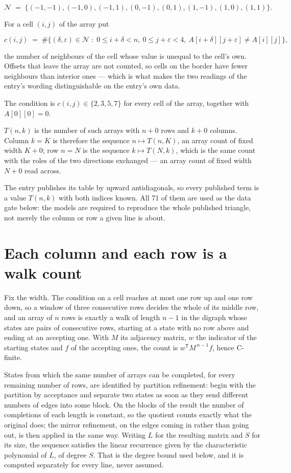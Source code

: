 \documentclass[11pt]{article}
\theoremstyle{definition}
\begin{document}
\[\mathcal{N} \;=\; \{(-1,-1), (-1,0), (-1,1), (0,-1), (0,1), (1,-1), (1,0), (1,1)\}.\]

For a cell $(i,j)$ of the array put

\[c(i,j) \;=\; \#\bigl\{(\delta,\varepsilon)\in\mathcal{N} \;:\; 0\le i+\delta<n,\ 0\le j+\varepsilon<4,\ A[i+\delta][j+\varepsilon] \neq A[i][j]\bigr\},\]

the number of neighbours of the cell whose value is unequal to the cell's own. Offsets that leave the array are not counted, so cells on the border have fewer neighbours than interior ones --- which is what makes the two readings of the entry's wording distinguishable on the entry's own data.

The condition is $c(i,j) \in \{2, 3, 5, 7\}$ for every cell of the array, together with $A[0][0]=0$.

$T(n,k)$ is the number of such arrays with $n + 0$ rows and $k + 0$ columns. Column $k = K$ is therefore the sequence $n \mapsto T(n,K)$, an array count of fixed width $K + 0$; row $n = N$ is the sequence $k \mapsto T(N,k)$, which is the same count with the roles of the two directions exchanged --- an array count of fixed width $N + 0$ read across.

The entry publishes its table by upward antidiagonals, so every published term is a value $T(n,k)$ with both indices known. All 71 of them are used as the data gate below: the models are required to reproduce the whole published triangle, not merely the column or row a given line is about.

\section{Each column and each row is a walk count}

Fix the width. The condition on a cell reaches at most one row up and one row down, so a window of three consecutive rows decides the whole of its middle row, and an array of $n$ rows is exactly a walk of length $n-1$ in the digraph whose states are pairs of consecutive rows, starting at a state with no row above and ending at an accepting one. With $M$ its adjacency matrix, $w$ the indicator of the starting states and $f$ of the accepting ones, the count is $w^{\mathsf T}M^{\,n-1}f$, hence C-finite.

States from which the same number of arrays can be completed, for every remaining number of rows, are identified by partition refinement: begin with the partition by acceptance and separate two states as soon as they send different numbers of edges into some block. On the blocks of the result the number of completions of each length is constant, so the quotient counts exactly what the original does; the mirror refinement, on the edges coming in rather than going out, is then applied in the same way. Writing $L$ for the resulting matrix and $S$ for its size, the sequence satisfies the linear recurrence given by the characteristic polynomial of $L$, of degree $S$. That is the degree bound used below, and it is computed separately for every line, never assumed.
\end{document}
